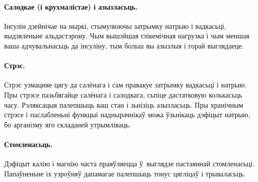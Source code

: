 \paragraph{Салодкае (і крухмалістае) і азызласьць.}
Інсулін дзейнічае на ныркі, стымулюючы затрымку натрыю і вадкасьці, выдзяленьне альдастэрону. Чым вышэйшая глікемічная нагрузка і чым меншая ваша адчувальнасьць да інсуліну, тым больш вы азызлыя і горай выглядаеце.

\paragraph{Стрэс.}
Стрэс узмацняе цягу да салёнага і сам правакуе затрымку вадкасьці і натрыю. Пры стрэсе пазьбягайце салёнага і салодкага, сьпіце дастатковую колькасьць часу. Рэляксацыя палепшыць ваш стан і зьнізіць азызласьць. Пры хранічным стрэсе і паслабленьні функцыі наднырачнікаў можа ўзьнікаць дэфіцыт натрыю, бо арганізму яго складаней утрымліваць.

\paragraph{Стомленасьць.}
Дэфіцыт калію і магнію часта праяўляецца ў~выглядзе пастаяннай стомленасьці. Папаўненьне іх узроўняў дапамагае палепшыць тонус цягліцаў і трываласьць.
